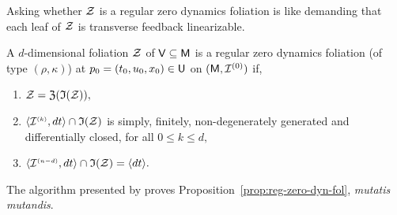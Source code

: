 \documentclass[a4paper]{ifacconf}
\begin{document}
Asking whether \(\mathcal{Z}\) is a regular zero dynamics foliation is like demanding that each leaf of \(\mathcal{Z}\) is transverse feedback linearizable.
%
\begin{prop}
  \label{prop:reg-zero-dyn-fol}
  A \(d\)-dimensional foliation \(\mathcal{Z}\) of \(\mathsf{V} \subseteq \mathsf{M}\) is a regular zero dynamics foliation (of type \((\rho, \kappa)\)) at \(p_0 = (t_0, u_0, x_0) \in \mathsf{U}\) on \((\mathsf{M}, \mathcal{I}^{(0)})\) if,
  \begin{enumerate}[label={(\roman*)}]
    \item{
      \label{prop:reg-zero-dyn-fol:invariance}
      \(
        \mathcal{Z} = \mathfrak{Z}(\mathfrak{I}(\mathcal{Z})),
      \)
    }
    \item{
      \label{prop:reg-zero-dyn-fol:regularity}
      \(
        \langle \mathcal{I}^{\smash{\scriptscriptstyle(k)}}, dt \rangle \cap \mathfrak{I}(\mathcal{Z})
      \)
      is simply, finitely, non-degenerately generated and differentially closed, for all \(0 \leq k \leq d,\)
    }
    \item{
      \label{prop:reg-zero-dyn-fol:controllability}
      \(
        \langle \mathcal{I}^{\smash{\scriptscriptstyle(n-d)}}, dt \rangle \cap \mathfrak{I}(\mathcal{Z})
        =
        \langle dt \rangle.
      \)
    }
  \end{enumerate}
\end{prop}
The algorithm presented by \cite{dsouza_algorithm_2023} proves Proposition~\ref{prop:reg-zero-dyn-fol}, \emph{mutatis mutandis}.
%

\end{document}
